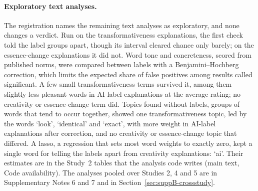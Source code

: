 \paragraph*{Exploratory text analyses.}
The registration names the remaining text analyses as exploratory, and none changes a verdict. Run on the transformativeness explanations, the first check told the label groups apart, though its interval cleared chance only barely; on the essence-change explanations it did not. Word tone and concreteness, scored from published norms, were compared between labels with a Benjamini--Hochberg correction, which limits the expected share of false positives among results called significant. A few small transformativeness terms survived it, among them slightly less pleasant words in AI-label explanations at the average rating; no creativity or essence-change term did. Topics found without labels, groups of words that tend to occur together, showed one transformativeness topic, led by the words `look', `identical' and `exact', with more weight in AI-label explanations after correction, and no creativity or essence-change topic that differed. A lasso, a regression that sets most word weights to exactly zero, kept a single word for telling the labels apart from creativity explanations: `ai'. Their estimates are in the Study~2 tables that the analysis code writes (main text, Code availability). The analyses pooled over Studies 2, 4 and 5 are in Supplementary Notes 6 and 7 and in Section~\ref{sec:suppB-crossstudy}.

\clearpage
